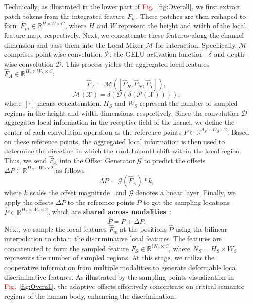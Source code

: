 Technically, as illustrated in the lower part of \textcolor{red}{Fig.}~\ref{fig:Overall}, we first extract patch tokens from the integrated feature \( F_{m} \).
%
These patches are then reshaped to form \( \hat{F}_{m} \in \mathbb{R}^{H \times W \times C} \), where \( H \) and \( W \) represent the height and width of the local feature map, respectively.
%
Next, we concatenate these features along the channel dimension and pass them into the Local Mixer \( \mathcal{M} \) for interaction.
%
Specifically, \( \mathcal{M} \) comprises point-wise convolution \( \mathcal{P} \), the GELU activation function~\cite{hendrycks2016gaussian} \( \delta \) and depth-wise convolution \( \mathcal{D} \).
%
This process yields the aggregated local features \( \hat{F}_{A} \in \mathbb{R}^{H_{S} \times W_{S} \times C} \):
%
\begin{equation}
    \hat{F}_{A} = \mathcal{M}([\hat{F}_{R}, \hat{F}_{N}, \hat{F}_{T}]),
\end{equation}
\begin{equation}
  \mathcal{M}(\mathcal{X}) = \delta(\mathcal{D}(\delta(\mathcal{P}(\mathcal{X})))),
\end{equation}
%
where \([\cdot]\) means concatenation.
%
\( H_{S} \) and \( W_{S} \) represent the number of sampled regions in the height and width dimensions, respectively.
%
Since the convolution \( \mathcal{D} \) aggregates local information in the receptive field of the kernel, we define the center of each convolution operation as the reference points \( P \in \mathbb{R}^{H_{S} \times W_{S} \times 2} \).
%
Based on these reference points, the aggregated local information is then used to determine the direction in which the model should shift within the local region.
%
Thus, we send \( \hat{F}_{A} \) into the Offset Generator \( \mathcal{G} \) to predict the offsets \( \Delta{P} \in \mathbb{R}^{H_{S} \times W_{S} \times 2} \) as follows:
%
\begin{equation}
    \Delta{P} = \mathcal{G}(\hat{F}_{A}) * k,
\end{equation}
%
where \( k \) scales the offset magnitude~\cite{xia2022vision} and \( \mathcal{G} \) denotes a linear layer.
%
Finally, we apply the offsets \( \Delta{P} \) to the reference points \( P \) to get the sampling locations \( \hat{P} \in \mathbb{R}^{H_{S} \times W_{S} \times 2} \), which are \textbf{shared across modalities}~\cite{zhang2024magic}:
\begin{equation}
    \hat{P} = P + \Delta{P}.
\end{equation}
Next, we sample the local features \( \hat{F}_{m} \) at the positions \( \hat{P} \) using the bilinear interpolation to obtain the discriminative local features.
%
The features are concatenated to form the sampled feature \( F_{S} \in \mathbb{R}^{3N_{S} \times C} \), where \( N_{S} = H_{S} \times W_{S} \) represents the number of sampled regions.
%
At this stage, we utilize the cooperative information from multiple modalities to generate deformable local discriminative features.
%
As illustrated by the sampling points visualization in \textcolor{red}{Fig.}~\ref{fig:Overall}, the adaptive offsets effectively concentrate on critical semantic regions of the human body, enhancing the discrimination.
%

